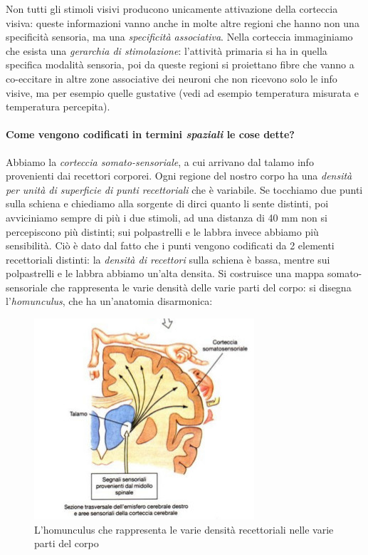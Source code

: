 \documentclass[a4paper,12pt]{article}
\begin{document}
Non tutti gli stimoli visivi producono unicamente attivazione della corteccia visiva: queste informazioni vanno anche in molte altre regioni che hanno non una specificità sensoria, ma una \emph{specificità associativa}. Nella corteccia immaginiamo che esista una \emph{gerarchia di stimolazione}: l'attività primaria si ha in quella specifica modalità sensoria, poi da queste regioni si proiettano fibre che vanno a co-eccitare in altre zone associative dei neuroni che non ricevono solo le info visive, ma per esempio quelle gustative (vedi ad esempio temperatura misurata e temperatura percepita).

\paragraph{Come vengono codificati in termini \emph{spaziali} le cose dette?}

Abbiamo la \emph{corteccia somato-sensoriale}, a cui arrivano dal talamo info provenienti dai recettori  corporei. Ogni regione del nostro corpo ha una \emph{densità per unità di superficie di punti recettoriali} che è variabile. Se tocchiamo due punti sulla schiena e chiediamo alla sorgente di dirci quanto li sente distinti, poi avviciniamo sempre di più i due stimoli, ad una distanza di 40 mm non si percepiscono più distinti; sui polpastrelli e le labbra  invece abbiamo più sensibilità. Ciò è dato dal fatto che i punti vengono codificati da 2 elementi recettoriali distinti: la \emph{densità di recettori} sulla schiena è bassa, mentre sui polpastrelli e le labbra abbiamo un'alta densita. Si costruisce una mappa somato-sensoriale che rappresenta le varie densità delle varie parti del corpo: si disegna l'\emph{homunculus}, che ha un'anatomia disarmonica:

\begin{figure}[H]
\centering
\includegraphics[scale=0.6]{immagine/homunculus.jpg}
\caption{L'homunculus che rappresenta le varie densità recettoriali nelle varie parti del corpo}
\end{figure}
\end{document}
